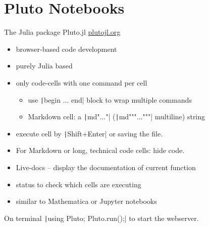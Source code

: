 \documentclass[aspectratio=169, 11pt, handout]{beamer}
\begin{document}
    \section{Pluto Notebooks}
    \begin{frame}[fragile]{The Julia package Pluto.jl}
        \hfill\href{https://plutojl.org}{plutojl.org}
        \begin{itemize}
            \item browser-based code development
            \item purely Julia based
            \pause
            \item only code-cells with \alert{one} command per cell
            \begin{itemize}
                \item use \texttt|begin ... end| block to wrap multiple commands
                \item Markdown cell: a \texttt|md"..."| (\texttt|md"""..."""| multiline) string
            \end{itemize}
            \item execute cell by \texttt|Shift+Enter| or saving the file.
            \pause
            \item For Markdown or long, technical code cells: hide code.
            \pause
            \item Live-docs – display the documentation of current function
            \pause
            \item status to check which cells are executing
            \pause
            \item similar to Mathematica or Jupyter notebooks
        \end{itemize}
        \pause
        On terminal \texttt|using Pluto; Pluto.run();| to start the webserver.
    \end{frame}
\end{document}
